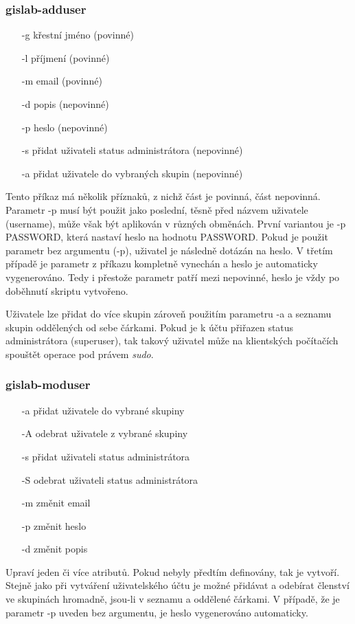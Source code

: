 \subsubsection{gislab-adduser}
\begin{itemize}
\item [-g] křestní jméno (povinné)
\item [-l] příjmení (povinné)
\item [-m] email (povinné)
\item [-d] popis (nepovinné)
\item [-p] heslo (nepovinné)
\item [-s] přidat uživateli status administrátora (nepovinné)
\item [-a] přidat uživatele do vybraných skupin (nepovinné)
\end{itemize}
Tento příkaz má několik příznaků, z nichž část je povinná, část nepovinná. Parametr \textsf{-p} musí být použit jako poslední, těsně před názvem uživatele (username), může však být aplikován v různých obměnách. První variantou je \textsf{-p PASSWORD}, která nastaví heslo na hodnotu PASSWORD. Pokud je použit parametr bez argumentu (\textsf{-p}), uživatel je následně dotázán na heslo. V třetím případě je parametr z příkazu kompletně vynechán a heslo je automaticky vygenerováno. Tedy i přestože parametr patří mezi nepovinné, heslo je vždy po doběhnutí skriptu vytvořeno.

Uživatele lze přidat do více skupin zároveň použitím parametru \textsf{-a} a seznamu skupin oddělených od sebe čárkami. Pokud je k účtu přiřazen status administrátora (superuser), tak takový uživatel může na klientských počítačích spouštět operace pod právem \textit{sudo}.

\subsubsection{gislab-moduser}
\begin{itemize}
\item [-a] přidat uživatele do vybrané skupiny
\item [-A] odebrat uživatele z vybrané skupiny
\item [-s] přidat uživateli status administrátora
\item [-S] odebrat uživateli status administrátora
\item [-m] změnit email
\item [-p] změnit heslo
\item [-d] změnit popis
\end{itemize}
Upraví jeden či více atributů. Pokud nebyly předtím definovány, tak je vytvoří. Stejně jako při vytváření uživatelského účtu je možné přidávat a odebírat členství ve skupinách hromadně, jsou-li v seznamu a oddělené čárkami. V případě, že je parametr \textsf{-p} uveden bez argumentu, je heslo vygenerováno automaticky.

